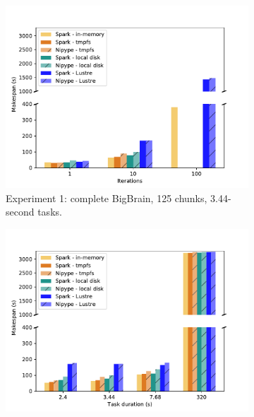 
\begin{figure}

\begin{subfigure}{0.5\columnwidth}
    \centering
    \captionsetup{width=.85\linewidth}
    \includegraphics[width=\columnwidth]{figures/inmem/iterations.pdf}%
    \caption{Experiment 1: complete BigBrain, 125 chunks, 3.44-second
    tasks.}\label{fig:inmem:iterations}
\end{subfigure}
\begin{subfigure}{0.5\columnwidth}
    \centering
    \captionsetup{width=.85\linewidth}
    \includegraphics[width=\linewidth]{figures/inmem/cputime.pdf}

\end{subfigure}
\end{figure}
